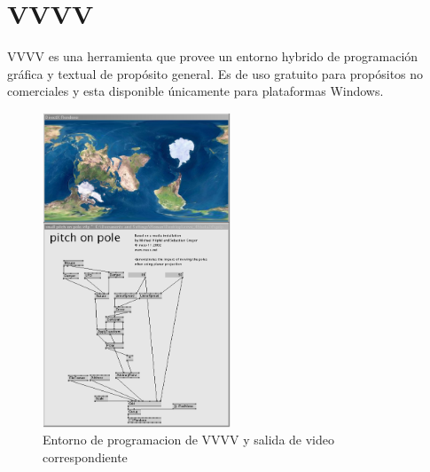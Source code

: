 \section{VVVV}
VVVV\cite{VVVV} es una herramienta que provee un entorno hybrido de programación gráfica y textual de propósito general. Es de uso gratuito para propósitos no comerciales y esta disponible únicamente para plataformas Windows.

\begin{figure}[H]
  \centering
    \includegraphics[width=0.5\textwidth]{./Cap3_aplicaciones/apps-vvvv.png}
  \caption{Entorno de programacion de VVVV y salida de video correspondiente}
  \label{fig:Apps-VVVV}
\end{figure}

